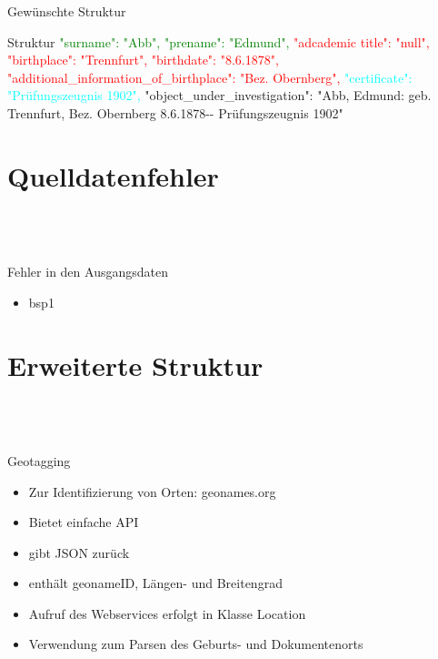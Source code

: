 \documentclass[12pt]{beamer}
\begin{document}
\begin{large}
\begin{frame}{Gewünschte Struktur}
 \begin{block}{Struktur}
  \small
  \textcolor{green}{"{}surname"{}: "{}Abb"{},}
  \newline
  \textcolor{green}{"{}prename"{}: "{}Edmund"{},}
  \newline 
  \textcolor{red}{"{}adcademic title"{}: "{}null"{},}
  \newline 
  \textcolor{red}{"{}birthplace"{}: "{}Trennfurt"{},}
  \newline
  \textcolor{red}{"{}birthdate"{}: "{}8.6.1878"{},}
  \newline
  \textcolor{red}{"{}additional\_information\_of\_birthplace"{}: "{}Bez. Obernberg"{},}
  \newline
  \textcolor{cyan}{"{}certificate"{}: "{}Prüfungszeugnis 1902"{},}
  \newline
  "{}object\_under\_investigation"{}: "{}Abb, Edmund: geb. Trennfurt, Bez. Obernberg 8.6.1878-{}- Prüfungszeugnis 1902"{}
 \end{block} 
\end{frame}




\section{Quelldatenfehler}
 \subsection*{~}
\begin{frame}{Fehler in den Ausgangsdaten}
 \begin{itemize}
  \item bsp1
  
 \end{itemize}
\end{frame}

\section{Erweiterte Struktur}
 \subsection*{~}

\begin{frame}{Geotagging}
\begin{itemize}
  \item Zur Identifizierung von Orten: geonames.org
  \item Bietet einfache API
  \item gibt JSON zurück
  \item enthält geonameID, Längen- und Breitengrad
  \item Aufruf des Webservices erfolgt in Klasse Location
  \item Verwendung zum Parsen des Geburts- und Dokumentenorts
 \end{itemize}
\end{frame}
 

\end{large}
\end{document}
